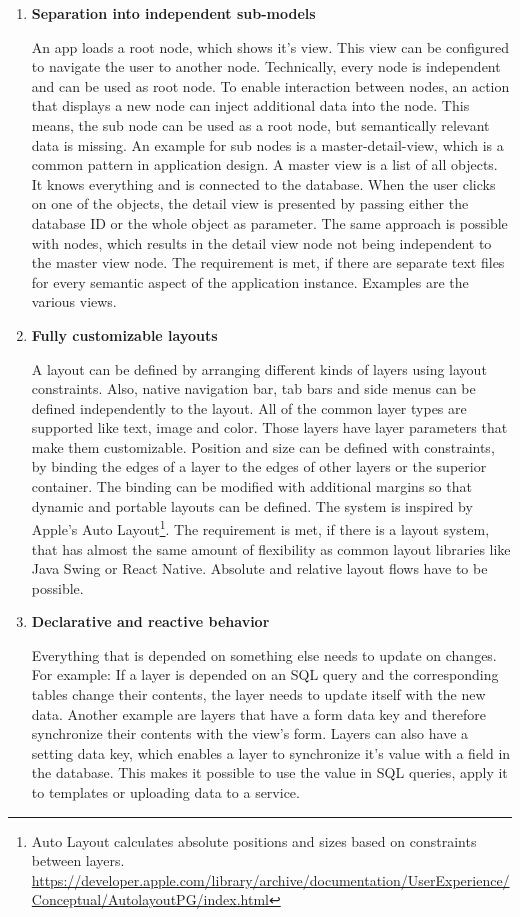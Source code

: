 \begin{enumerate}
	\item \textbf{Separation into independent sub-models}
	
	An app loads a root node, which shows it's view.
	This view can be configured to navigate the user to another node.
	Technically, every node is independent and can be used as root node.
	To enable interaction between nodes, an action that displays a new node can inject additional data into the node.
	This means, the sub node can be used as a root node, but semantically relevant data is missing.
	An example for sub nodes is a master-detail-view, which is a common pattern in application design.
	A master view is a list of all objects.
	It knows everything and is connected to the database.
	When the user clicks on one of the objects, the detail view is presented by passing either the database ID or the whole object as parameter.
	The same approach is possible with nodes, which results in the detail view node not being independent to the master view node.
	The requirement is met, if there are separate text files for every semantic aspect of the application instance.
	Examples are the various views.
	
	\item \textbf{Fully customizable layouts}
	
	A layout can be defined by arranging different kinds of layers using layout constraints.
	Also, native navigation bar, tab bars and side menus can be defined independently to the layout.
	All of the common layer types are supported like text, image and color.
	Those layers have layer parameters that make them customizable.
	Position and size can be defined with constraints, by binding the edges of a layer to the edges of other layers or the superior container.
	The binding can be modified with additional margins so that dynamic and portable layouts can be defined.
	The system is inspired by Apple's Auto Layout\footnote{Auto Layout calculates absolute positions and sizes based on constraints between layers. \url{https://developer.apple.com/library/archive/documentation/UserExperience/Conceptual/AutolayoutPG/index.html}}.
	The requirement is met, if there is a layout system, that has almost the same amount of flexibility as common layout libraries like Java Swing or React Native.
	Absolute and relative layout flows have to be possible.
	
	\item \textbf{Declarative and reactive behavior}
	
	Everything that is depended on something else needs to update on changes.
	For example: If a layer is depended on an \ac{SQL} query and the corresponding tables change their contents, the layer needs to update itself with the new data.
	Another example are layers that have a form data key and therefore synchronize their contents with the view's form.
	Layers can also have a setting data key, which enables a layer to synchronize it's value with a field in the database.
	This makes it possible to use the value in \ac{SQL} queries, apply it to templates or uploading data to a service.
	

\end{enumerate}
